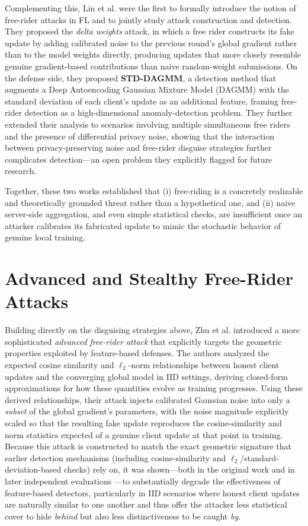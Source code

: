 Complementing this, Lin et al. \cite{lin2019freeriders} were the first to formally introduce the notion of free-rider attacks in FL and to jointly study attack construction and detection. They proposed the \emph{delta weights} attack, in which a free rider constructs its fake update by adding calibrated noise to the previous round's global gradient rather than to the model weights directly, producing updates that more closely resemble genuine gradient-based contributions than naive random-weight submissions. On the defense side, they proposed \textbf{STD-DAGMM}, a detection method that augments a Deep Autoencoding Gaussian Mixture Model (DAGMM) with the standard deviation of each client's update as an additional feature, framing free-rider detection as a high-dimensional anomaly-detection problem. They further extended their analysis to scenarios involving multiple simultaneous free riders and the presence of differential privacy noise, showing that the interaction between privacy-preserving noise and free-rider disguise strategies further complicates detection—an open problem they explicitly flagged for future research.

Together, these two works established that (i) free-riding is a concretely realizable and theoretically grounded threat rather than a hypothetical one, and (ii) naive server-side aggregation, and even simple statistical checks, are insufficient once an attacker calibrates its fabricated update to mimic the stochastic behavior of genuine local training.

\section{Advanced and Stealthy Free-Rider Attacks}
\label{subsec:advanced-attacks}

Building directly on the disguising strategies above, Zhu et al. \cite{zhu2023advanced} introduced a more sophisticated \emph{advanced free-rider attack} that explicitly targets the geometric properties exploited by feature-based defenses. The authors analyzed the expected cosine similarity and $\ell_2$-norm relationships between honest client updates and the converging global model in IID settings, deriving closed-form approximations for how these quantities evolve as training progresses. Using these derived relationships, their attack injects calibrated Gaussian noise into only a \emph{subset} of the global gradient's parameters, with the noise magnitude explicitly scaled so that the resulting fake update reproduces the cosine-similarity and norm statistics expected of a genuine client update at that point in training. Because this attack is constructed to match the exact geometric signature that earlier detection mechanisms (including cosine-similarity and $\ell_2$/standard-deviation-based checks) rely on, it was shown—both in the original work and in later independent evaluations \cite{recasens2024frida}—to substantially degrade the effectiveness of feature-based detectors, particularly in IID scenarios where honest client updates are naturally similar to one another and thus offer the attacker less statistical cover to hide \emph{behind} but also less distinctiveness to be caught \emph{by}.

